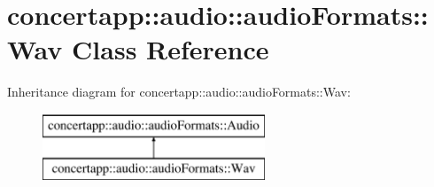 \hypertarget{classconcertapp_1_1audio_1_1audio_formats_1_1_wav}{
\section{concertapp::audio::audioFormats::Wav Class Reference}
\label{classconcertapp_1_1audio_1_1audio_formats_1_1_wav}
}
Inheritance diagram for concertapp::audio::audioFormats::Wav:\begin{figure}[H]
\begin{center}
\leavevmode
\includegraphics[height=2.000000cm]{classconcertapp_1_1audio_1_1audio_formats_1_1_wav}
\end{center}
\end{figure}
